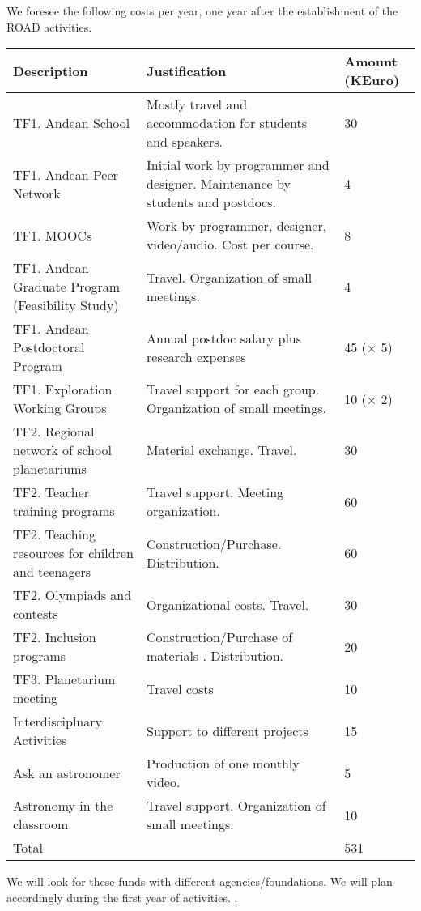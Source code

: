 \documentclass[12pt]{article}
\begin{document}
We foresee the following costs per year, one year after the
establishment of the ROAD activities.

\begin{center}
\begin{tabular}{|p{5cm} |p{6cm}|p{1.5cm}|}\hline\hline
Description & Justification&Amount (KEuro) \\\hline
TF1. Andean School & Mostly travel and accommodation for students and speakers. & 30 \\ \hline
TF1. Andean Peer Network & Initial work by programmer and
designer. Maintenance by students and postdocs.& 4 \\ \hline
TF1. MOOCs & Work by programmer, designer, video/audio. Cost
per course. & 8 \\\hline
TF1. Andean Graduate Program (Feasibility Study) &
Travel. Organization of small meetings. & 4\\\hline
TF1. Andean Postdoctoral Program & Annual postdoc salary plus research
expenses & 45 ($\times$ 5)\\ \hline
TF1. Exploration Working Groups & Travel support for each
group. Organization of small meetings. & 10
($\times$ 2)\\\hline
TF2. Regional network of school planetariums  & Material exchange. Travel.& 30\\\hline
TF2. Teacher training programs  & Travel support. Meeting organization.& 60 \\\hline
TF2. Teaching resources for children and teenagers &
Construction/Purchase. Distribution. & 60\\\hline
TF2. Olympiads and contests & Organizational costs. Travel. & 30\\\hline
TF2. Inclusion programs & Construction/Purchase of materials . Distribution.& 20\\\hline
TF3. Planetarium meeting & Travel costs & 10\\\hline
Interdisciplnary Activities & Support to different projects & 15 \\\hline
Ask an astronomer & Production of one monthly video.& 5 \\\hline
Astronomy in the classroom & Travel support. Organization of small
meetings. & 10\\\hline
Total & & 531\\\hline\hline
\end{tabular}
\end{center}

We will look for these funds with different agencies/foundations. We
will plan accordingly during the first year of activities.
\newpage.
\end{document}
